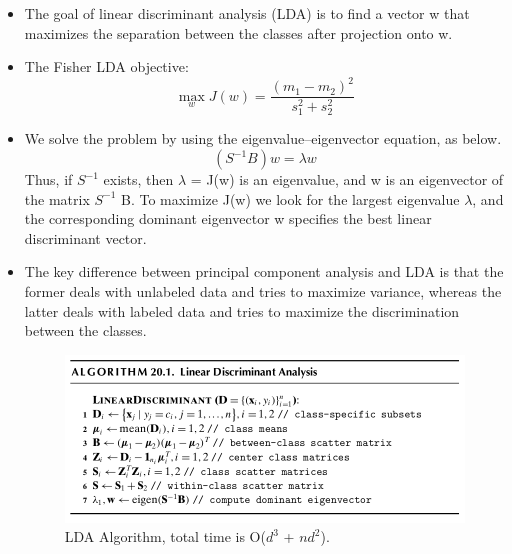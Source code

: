 \begin{itemize}
    \item The goal of linear discriminant analysis (LDA) is to find a vector w that maximizes the separation between the classes after projection onto w.
    \item The Fisher LDA objective: \[ \operatorname*{max}_w J(w) = \frac{(m_1 - m_2)^2}{s_1^2 + s_2^2}\] 
    \item We solve the problem by using the eigenvalue–eigenvector equation, as below. \[(S^{-1}B)w = \lambda w \]
    Thus, if \(S^{-1}\) exists, then \(\lambda\) = J(w) is an eigenvalue, and w is an eigenvector of the matrix
    \(S^{-1}\) B. To maximize J(w) we look for the largest eigenvalue \(\lambda\), and the corresponding dominant eigenvector w specifies the best linear discriminant vector.
    \item The key difference between principal component analysis and LDA is that the former deals with unlabeled data and tries to maximize variance, whereas the latter deals with labeled data and tries to maximize the discrimination between the classes.
    \begin{figure}[H]
        \includegraphics[width=\textwidth]{Figures/lda.png}
        \caption{\label{fig:figure2}LDA Algorithm, total time is
        O($d^3$ + $nd^2$).}
    \end{figure}
\end{itemize}